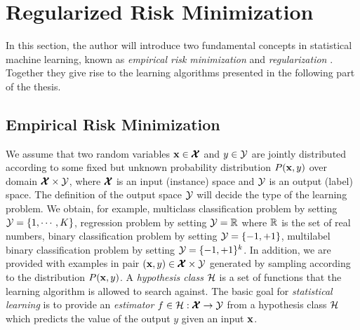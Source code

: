 %
\section{Regularized Risk Minimization}\label{sc_rrm}

In this section, the author will introduce two fundamental concepts in statistical machine learning, known as \textit{empirical risk minimization} \citep{Vapnik92principles} and \textit{regularization} \citep{Evgeniou99a} .
Together they give rise to the learning algorithms presented in the following part of the thesis.

\subsection{Empirical Risk Minimization}\label{sc_erm}

We assume that two random variables $\mathbf {x}\in\pmb {\mathcal{X}}$ and $y\in\mathcal{Y}$ are jointly distributed according to some fixed but unknown probability distribution $P(\mathbf {x},y)$ over domain $\pmb {\mathcal{X}}\times\mathcal{Y}$, where $\pmb {\mathcal{X}}$ is an input (instance) space and $\mathcal{Y}$ is an output (label) space.
The definition of the output space $\mathcal{Y}$ will decide the type of the learning problem.
We obtain, for example, 
multiclass classification problem by setting $\mathcal{Y}=\{1,\cdots,K\}$, regression problem by setting $\mathcal{Y}=\mathbb{R}$ where $\mathbb{R}$ is the set of real numbers, 
binary classification problem by setting $\mathcal{Y}=\{-1,+1\}$, 
multilabel binary classification problem by setting $\mathcal{Y} = \{-1,+1\}^k$.
In addition, we are provided with examples in pair $(\mathbf {x},y)\in\pmb {\mathcal{X}}\times\mathcal{Y}$ generated by sampling according to the distribution $P(\mathbf {x},y)$.
A \textit{hypothesis class} $\mathcal{H}$ is a set of functions that the learning algorithm is allowed to search against.
The basic goal for \textit{statistical learning} is to provide an \textit{estimator} $f\in\mathcal{H}:\pmb {\mathcal{X}}\rightarrow\mathcal{Y}$ from a hypothesis class $\mathcal{H}$ which predicts the value of the output $y$ given an input $\mathbf {x}$.

